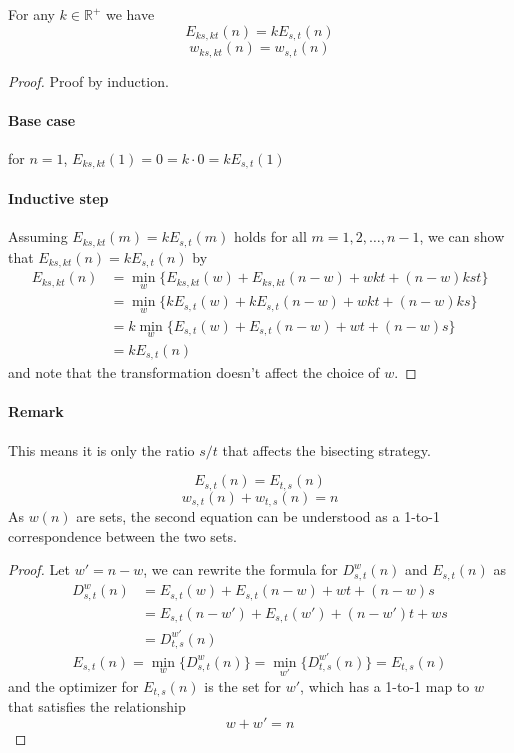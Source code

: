 \documentclass[]{article}
\begin{document}
\vspace{1cm}
\begin{lemma}[Homogeneity] For any $k\in\mathbb{R}^+$ we have
\[
	E_{ks,kt}(n) = k E_{s,t}(n)
\]
\[
	w_{ks,kt}(n) = w_{s,t}(n)
\]
\end{lemma}
\begin{proof}
		Proof by induction.
	\paragraph{Base case} for $n = 1$, $E_{ks,kt}(1) = 0 = k\cdot0 = kE_{s,t}(1)$
	\paragraph{Inductive step} Assuming $E_{ks,kt}(m) = k E_{s,t}(m)$ holds for all $m = 1,2,\dots,n-1$, we can show that $E_{ks,kt}(n) = k E_{s,t}(n)$ by
	\begin{align*}
	E_{ks,kt}(n) &= \min_{w}\{E_{ks,kt}(w) + E_{ks,kt}(n-w) + wkt +(n-w)kst\}\\
	  &= \min_{w}\{k E_{s,t}(w) + k E_{s,t}(n-w) + wkt +(n-w)ks\}\\
	  &= k\min_{w}\{E_{s,t}(w) + E_{s,t}(n-w) + wt +(n-w)s\}\\
	  &=kE_{s,t}(n)
	\end{align*}
	and note that the transformation doesn't affect the choice of $w$.
\end{proof}
\paragraph{Remark}
This means it is only the ratio $s/t$ that affects the bisecting strategy.


\vspace{1cm}
\begin{lemma}[Symmetry]
	\[
		E_{s,t}(n) = E_{t,s}(n)
	\]
	\[
		w_{s,t}(n) + w_{t,s}(n) = n
	\]
As $w(n)$ are sets, the second equation can be understood as a 1-to-1 correspondence between the two sets.
\end{lemma}
\begin{proof}
	Let $w' = n - w$, we can rewrite the formula for $D^w_{s,t}(n)$ and $E_{s,t}(n)$ as
	\begin{align*}
	D^w_{s,t}(n) &= E_{s,t}(w) + E_{s,t}(n-w) + wt +(n-w)s\\
	&= E_{s,t}(n-w') + E_{s,t}(w') + (n-w')t +ws\\
	&=D^{w'}_{t,s}(n)
	\end{align*}
	\[
	E_{s,t}(n) = \min_w\{D^w_{s,t}(n)\} = \min_{w'}\{D^{w'}_{t,s}(n)\} = E_{t,s}(n)
	\]
	and the optimizer for $E_{t,s}(n)$ is the set for $w'$, which has a 1-to-1 map to $w$ that satisfies the relationship
	\[
	w + w' = n
	\]
\end{proof}
\end{document}
